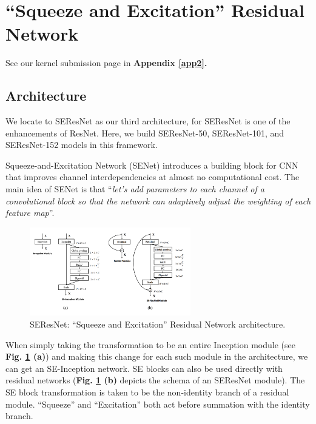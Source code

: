 \documentclass[10pt,twocolumn,letterpaper]{article}
\begin{document}

\section{``Squeeze and Excitation'' Residual Network} \label{SECSE}

See our kernel submission page in \textbf{Appendix \ref{app2}.}

\subsection{Architecture}

We locate to \textsf{SEResNet} as our third architecture, for \textsf{SEResNet} is one of the enhancements of \textsf{ResNet}. Here, we build \textsf{SEResNet-50}, \textsf{SEResNet-101}, and \textsf{SEResNet-152} models in this framework.

Squeeze-and-Excitation Network (\textsf{SENet}) introduces a building block for CNN that improves channel interdependencies at almost no computational cost. The main idea of \textsf{SENet} is that ``\textit{let’s add parameters to each channel of a convolutional block so that the network can adaptively adjust the weighting of each feature map}''.

\begin{figure}[h]
\centering
\includegraphics[width=7cm]{seblock.pdf}
\caption{\textsf{SEResNet}: ``Squeeze and Excitation'' Residual Network architecture.}
\label{seblock}
\end{figure}

When simply taking the transformation to be an entire Inception module (see \textbf{Fig. \ref{seblock} (a)}) and making this change for each such module in the architecture, we can get an SE-Inception network. SE blocks can also be used directly with residual networks (\textbf{Fig. \ref{seblock} (b)} depicts the schema of an \textsf{SEResNet} module). The SE block transformation is taken to be the non-identity branch of a residual module. ``Squeeze'' and ``Excitation'' both act before summation with the identity branch.
\end{document}
